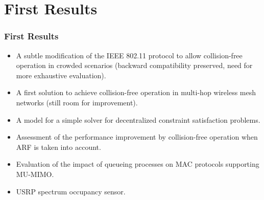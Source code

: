 \documentclass{beamer}
\begin{document}
\section{First Results}
\begin{frame}
  \frametitle{First Results}
      \begin{block}{}
        \begin{itemize}
          \item \alert<2>{A subtle modification of the IEEE 802.11 protocol to allow collision-free operation in crowded scenarios (backward compatibility preserved, need for more exhaustive evaluation).}
          \item A first solution to achieve collision-free operation in multi-hop wireless mesh networks (still room for improvement).
          \item A model for a simple solver for decentralized constraint satisfaction problems.
          \item Assessment of the performance improvement by collision-free operation when ARF is taken into account.
          \item Evaluation of the impact of queueing processes on MAC protocols supporting MU-MIMO.
          \item USRP spectrum occupancy sensor.
        \end{itemize}
      \end{block}
\end{frame}
\end{document}
